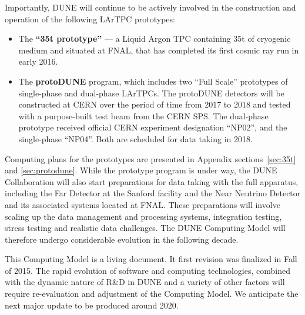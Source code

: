 Importantly, DUNE will continue to be actively involved in the construction and operation of the following LArTPC prototypes:
\begin{itemize}

\item The \textbf{``35t prototype''} --- a Liquid Argon TPC containing 35t of cryogenic medium and situated at FNAL,
that has completed its first cosmic ray run in early 2016.

\item The \textbf{protoDUNE} program, which includes two ``Full Scale'' prototypes of single-phase and dual-phase LArTPCs.
The protoDUNE detectors will be constructed at CERN over the period of time from 2017 to 2018 and tested with a purpose-built
test beam from the CERN SPS. The dual-phase prototype received official CERN experiment designation ``NP02'', and the single-phase ``NP04''.
Both are scheduled for  data taking in 2018.

\end{itemize}

\noindent
Computing plans for the prototypes are presented in Appendix sections~\ref{sec:35t} and \ref{sec:protodune}.
While the prototype program is under way, the DUNE Collaboration will also start preparations for data taking with the
full apparatus, including the Far Detector at the Sanford facility and the Near Neutrino Detector and its associated systems
located at FNAL.  These preparations will involve scaling up the data management and processing systems,
integration testing,  stress testing and realistic data challenges.
The DUNE Computing Model will therefore undergo considerable evolution in the following decade.

This Computing Model is a living document. It first revision was finalized in Fall of 2015.
The rapid evolution of software and computing technologies, combined with the dynamic nature of R\&D in DUNE
and a variety of other factors will require re-evaluation and adjustment of the Computing Model. 
We anticipate the next major update to be produced around 2020.
